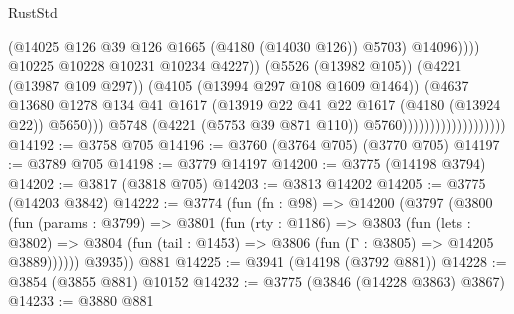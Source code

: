 \begin{lexlean}{RustStd}
\begin{coremodule}
                                                        (@14025
                                                          @126
                                                          @39
                                                          @126
                                                          @1665
                                                          (@4180 (@14030 @126))
                                                          @5703)
                                                        @14096))))
                                                @10225
                                                @10228
                                                @10231
                                                @10234
                                                @4227))
                                            (@5526 (@13982 @105))
                                            (@4221 (@13987 @109 @297))
                                            (@4105 (@13994 @297 @108 @1609 @1464))
                                            (@4637
                                              @13680
                                              @1278
                                              @134
                                              @41
                                              @1617
                                              (@13919
                                                @22
                                                @41
                                                @22
                                                @1617
                                                (@4180 (@13924 @22))
                                                @5650)))
                                          @5748
                                          (@4221 (@5753 @39 @871 @110))
                                          @5760)))))))))))))))))))
@14192 := @3758 @705
@14196 := @3760 (@3764 @705) (@3770 @705)
@14197 := @3789 @705
@14198 := @3779 @14197
@14200 := @3775 (@14198 @3794)
@14202 := @3817 (@3818 @705)
@14203 := @3813 @14202
@14205 := @3775 (@14203 @3842)
@14222 := @3774
    (fun (fn : @98) =>
    @14200
      (@3797
        (@3800
          (fun (params : @3799) =>
          @3801
            (fun (rty : @1186) =>
            @3803
              (fun (lets : @3802) =>
              @3804 (fun (tail : @1453) => @3806 (fun (Γ : @3805) => @14205 @3889))))))
        @3935))
    @881
@14225 := @3941 (@14198 (@3792 @881))
@14228 := @3854 (@3855 @881) @10152
@14232 := @3775 (@3846 (@14228 @3863) @3867)
@14233 := @3880 @881

\end{coremodule}
\end{lexlean}
